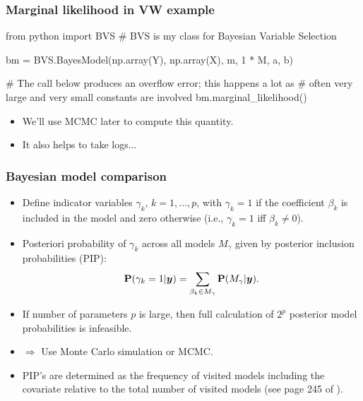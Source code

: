 \documentclass[xcolor=table,10pt]{beamer}
\begin{document}
\begin{frame}[fragile]
  \frametitle{Marginal likelihood in VW example}
{\scriptsize%
\begin{pyconsole}[vw][frame=single]
from python import BVS
# BVS is my class for Bayesian Variable Selection

bm = BVS.BayesModel(np.array(Y), np.array(X), m, 1 * M, a, b)


# The call below produces an overflow error; this happens a lot as
# often very large and very small constants are involved
bm.marginal_likelihood()
\end{pyconsole}
}
\begin{itemize}
\item We'll use MCMC later to compute this quantity.
\item It also helps to take logs...
\end{itemize}
\end{frame}

\begin{frame}
  \frametitle{Bayesian model comparison}
  \begin{itemize}
  \item Define indicator variables $\gamma_k$, $k=1,\ldots, p$, with
    $\gamma_k=1$ if the coefficient $\beta_k$ is included in the model
    and zero otherwise (i.e., $\gamma_k=1$ iff $\beta_k\not=0$).
  \item Posteriori probability of $\gamma_k$ across all models
    $M_{\gamma}$ given by \alert{posterior inclusion probabilities
      (PIP)}:
    \begin{equation}
      \label{eq:3}
      {\bf P}(\gamma_k=1|\bm y) = \sum_{\beta_k\in M_\gamma} {\bf P}(M_\gamma|\bm y).
    \end{equation}
    \vspace*{-\baselineskip}
  \item If number of parameters $p$ is large, then full calculation of
    $2^p$ posterior model probabilities is infeasible.
  \item $\Rightarrow$ Use Monte Carlo simulation or MCMC.
  \item PIP's are determined as the \alert{frequency} of visited models
    including the covariate relative to the total number of visited
    models (see page 245 of \citep{Fahrmeir2013}).
  \end{itemize}
\end{frame}
\end{document}
